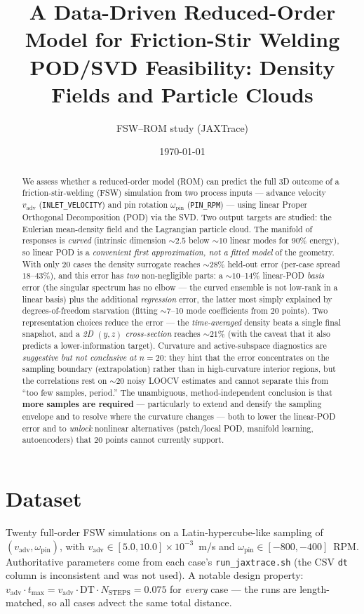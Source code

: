 \documentclass[11pt]{article}
\title{\textbf{A Data-Driven Reduced-Order Model for Friction-Stir Welding}\\[2pt]
\large POD/SVD Feasibility: Density Fields and Particle Clouds}
\author{FSW--ROM study (JAXTrace)}
\date{\today}
\newcommand{\vadv}{v_{\mathrm{adv}}}
\newcommand{\opin}{\omega_{\mathrm{pin}}}
\begin{document}
\maketitle

\begin{abstract}
We assess whether a reduced-order model (ROM) can predict the full 3D
outcome of a friction-stir-welding (FSW) simulation from two process
inputs --- advance velocity $\vadv$ (\texttt{INLET\_VELOCITY}) and pin
rotation $\opin$ (\texttt{PIN\_RPM}) --- using linear Proper Orthogonal
Decomposition (POD) via the SVD. Two output targets are studied: the
Eulerian mean-density field and the Lagrangian particle cloud. The
manifold of responses is \emph{curved} (intrinsic dimension ${\sim}2.5$
below ${\sim}10$ linear modes for 90\% energy), so linear POD is a
\emph{convenient first approximation, not a fitted model} of the geometry.
With only 20 cases the density surrogate reaches ${\sim}28\%$ held-out
error (per-case spread $18$--$43\%$), and this error has \emph{two}
non-negligible parts: a ${\sim}10$--14\% linear-POD \emph{basis} error (the
singular spectrum has no elbow --- the curved ensemble is not low-rank in a
linear basis) plus the additional \emph{regression} error, the latter most
simply explained by degrees-of-freedom starvation (fitting ${\sim}7$--10
mode coefficients from 20 points). Two representation choices
reduce the error --- the \emph{time-averaged} density beats a single final
snapshot, and a \emph{2D $(y,z)$ cross-section} reaches ${\sim}21\%$ (with
the caveat that it also predicts a lower-information target). Curvature and
active-subspace diagnostics are \emph{suggestive but not conclusive at
$n{=}20$}: they hint that the error concentrates on the sampling boundary
(extrapolation) rather than in high-curvature interior regions, but the
correlations rest on ${\sim}20$ noisy LOOCV estimates and cannot separate
this from ``too few samples, period.'' The unambiguous, method-independent
conclusion is that \textbf{more samples are required} --- particularly to
extend and densify the sampling envelope and to resolve where the curvature
changes --- both to lower the linear-POD error and to \emph{unlock}
nonlinear alternatives (patch/local POD, manifold learning, autoencoders)
that 20 points cannot currently support.
\end{abstract}

\tableofcontents

\section{Dataset}
Twenty full-order FSW simulations on a Latin-hypercube-like sampling of
$(\vadv,\opin)$, with $\vadv\in[5.0,10.0]\times10^{-3}$~m/s and
$\opin\in[-800,-400]$~RPM. Authoritative parameters come from each case's
\texttt{run\_jaxtrace.sh} (the CSV \texttt{dt} column is inconsistent and
was not used). A notable design property: $\vadv\cdot t_{\max}=\vadv\cdot
\mathrm{DT}\cdot N_{\mathrm{STEPS}}=0.075$ for \emph{every} case --- the
runs are length-matched, so all cases advect the same total distance.
\end{document}
